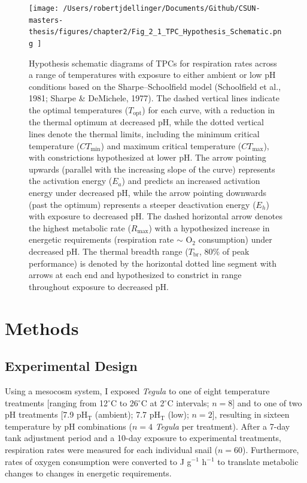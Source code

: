 \documentclass{CSUNthesis}
\begin{document}
\newpage

\begin{figure}[H]
  \centering
  \texttt{[image:  /Users/robertjdellinger/Documents/Github/CSUN-masters-thesis/figures/chapter2/Fig\_2\_1\_TPC\_Hypothesis\_Schematic.png ]}
  \caption[Hypothesis schematic diagram of TPCs under ambient and low pH conditions.]{Hypothesis schematic diagrams of TPCs for respiration rates across a range of temperatures with exposure to either ambient or low pH conditions based on the Sharpe--Schoolfield model (Schoolfield et al., 1981; Sharpe \& DeMichele, 1977). The dashed vertical lines indicate the optimal temperatures ($T_{\text{opt}}$) for each curve, with a reduction in the thermal optimum at decreased pH, while the dotted vertical lines denote the thermal limits, including the minimum critical temperature ($CT_{\text{min}}$) and maximum critical temperature ($CT_{\text{max}}$), with constrictions hypothesized at lower pH. The arrow pointing upwards (parallel with the increasing slope of the curve) represents the activation energy ($E_a$) and predicts an increased activation energy under decreased pH, while the arrow pointing downwards (past the optimum) represents a steeper deactivation energy ($E_h$) with exposure to decreased pH. The dashed horizontal arrow denotes the highest metabolic rate ($R_{\text{max}}$) with a hypothesized increase in energetic requirements (respiration rate $\sim$ O$_2$ consumption) under decreased pH. The thermal breadth range ($T_{\text{br}}$, 80\% of peak performance) is denoted by the horizontal dotted line segment with arrows at each end and hypothesized to constrict in range throughout exposure to decreased pH.}
  \label{fig:tpc_hypothesis_schematic}
\end{figure}

\section*{Methods}\label{methods}

\subsection*{Experimental Design}\label{experimental-design}

Using a mesocosm system, I exposed \textit{Tegula} to one of eight temperature treatments {[}ranging from 12\(^\circ\)C to 26\(^\circ\)C at 2\(^\circ\)C intervals; \(n=8\){]} and to one of two pH treatments {[}7.9 pH\(_\mathrm{T}\) (ambient); 7.7 pH\(_\mathrm{T}\) (low); \(n=2\){]}, resulting in sixteen temperature by pH combinations (\(n=4\) \textit{Tegula} per treatment). After a 7-day tank adjustment period and a 10-day exposure to experimental treatments, respiration rates were measured for each individual snail (\(n=60\)). Furthermore, rates of oxygen consumption were converted to J g\(^{-1}\) h\(^{-1}\) to translate metabolic changes to changes in energetic requirements.
\end{document}

